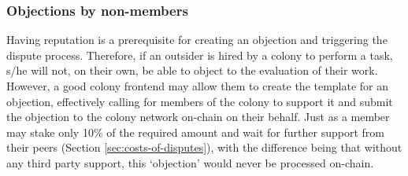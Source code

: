 \subsubsection{Objections by non-members}

Having reputation is a prerequisite for creating an objection and triggering the dispute process. Therefore, if an outsider is hired by a colony to perform a task, s/he will not, on their own, be able to object to the evaluation of their work.
However, a good colony frontend may allow them to create the template for an objection, effectively calling for members of the colony to support it and submit the objection to the colony network on-chain on their behalf.  
Just as a member may stake only 10\% of the required amount and wait for further support from their peers (Section \ref{sec:costs-of-disputes}), with the difference being that without any third party support, this `objection' would never be processed on-chain.